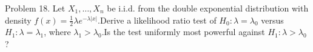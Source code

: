 \documentclass[preview]{standalone}
\begin{document}
\begin{center}
Problem 18. Let $X_1,\dots,X_n$ be i.i.d. from the double exponential distribution with density $f(x)=\tfrac12\lambda e^{-\lambda|x|}$.Derive a likelihood ratio test of $H_0:\lambda=\lambda_0$ versus $H_1:\lambda=\lambda_1$, where $\lambda_1>\lambda_0$.Is the test uniformly most powerful against $H_1:\lambda>\lambda_0$?
\end{center}
\end{document}
